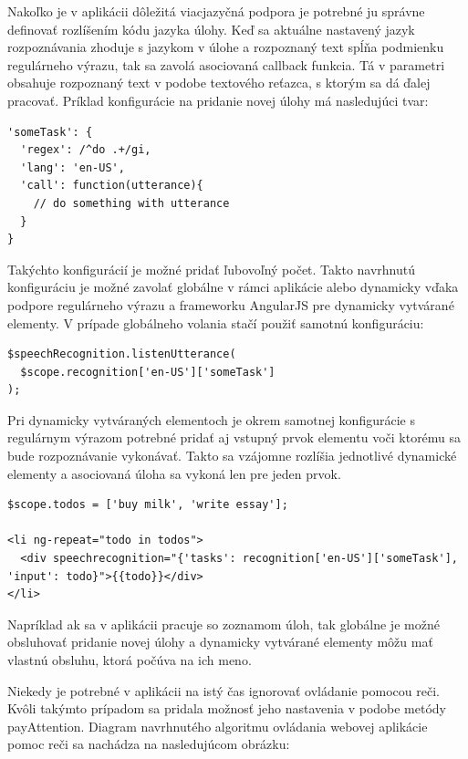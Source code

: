Nakoľko je v aplikácii dôležitá viacjazyčná podpora je potrebné ju správne definovať rozlíšením kódu jazyka úlohy. Keď sa aktuálne nastavený jazyk rozpoznávania zhoduje s jazykom v úlohe a rozpoznaný text spĺňa podmienku regulárneho výrazu, tak sa zavolá asociovaná callback funkcia. Tá v parametri obsahuje rozpoznaný text v podobe textového reťazca, s ktorým sa dá ďalej pracovať. Príklad konfigurácie na pridanie novej úlohy má nasledujúci tvar:

\begin{lstlisting}
'someTask': {
  'regex': /^do .+/gi,
  'lang': 'en-US',
  'call': function(utterance){
    // do something with utterance
  }
}
\end{lstlisting}


Takýchto konfigurácií je možné pridať ľubovoľný počet. Takto navrhnutú konfiguráciu je možné zavolať globálne v rámci aplikácie alebo dynamicky vďaka podpore regulárneho výrazu a frameworku AngularJS pre dynamicky vytvárané elementy. V prípade globálneho volania stačí použiť samotnú konfiguráciu:

\begin{lstlisting}
$speechRecognition.listenUtterance(
  $scope.recognition['en-US']['someTask']
);
\end{lstlisting}

Pri dynamicky vytváraných elementoch je okrem samotnej konfigurácie s regulárnym výrazom potrebné pridať aj vstupný prvok elementu voči ktorému sa bude rozpoznávanie vykonávať. Takto sa vzájomne rozlíšia jednotlivé dynamické elementy a asociovaná úloha sa vykoná len pre jeden prvok.

\begin{lstlisting}
$scope.todos = ['buy milk', 'write essay'];

<li ng-repeat="todo in todos">
  <div speechrecognition="{'tasks': recognition['en-US']['someTask'], 'input': todo}">{{todo}}</div>
</li>
\end{lstlisting}

Napríklad ak sa v aplikácii pracuje so zoznamom úloh, tak globálne je možné obsluhovať pridanie novej úlohy a dynamicky vytvárané elementy môžu mať vlastnú obsluhu, ktorá počúva na ich meno. 

Niekedy je potrebné v aplikácii na istý čas ignorovať ovládanie pomocou reči. Kvôli takýmto prípadom sa pridala možnosť jeho nastavenia v podobe metódy payAttention. Diagram navrhnutého algoritmu ovládania webovej aplikácie pomoc reči sa nachádza na nasledujúcom obrázku:

